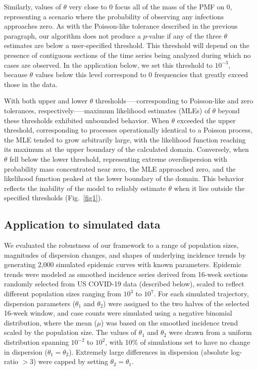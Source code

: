 \documentclass[11pt,letterpaper]{article}
\begin{document}
Similarly, values of $\theta$ very close to 0 focus all of the mass of the PMF on 0, representing a scenario where the probability of observing any infections approaches zero. As with the Poisson-like tolerance described in the previous paragraph, our algorithm does not produce a $p$-value if any of the three $\theta$ estimates are below a user-specified threshold. This threshold will depend on the presence of contiguous sections of the time series being analyzed during which no cases are observed. In the application below, we set this threshold to $10^{-3}$, because $\theta$ values below this level correspond to 0 frequencies that greatly exceed those in the data.

With both upper and lower $\theta$ thresholds--—corresponding to Poisson-like and zero tolerances, respectively—--maximum likelihood estimates (MLEs) of $\theta$ beyond these thresholds exhibited unbounded behavior. When $\theta$ exceeded the upper threshold, corresponding to processes operationally identical to a Poisson process, the MLE tended to grow arbitrarily large, with the likelihood function reaching its maximum at the upper boundary of the calculated domain. Conversely, when $\theta$ fell below the lower threshold, representing extreme overdispersion with probability mass concentrated near zero, the MLE approached zero, and the likelihood function peaked at the lower boundary of the domain. This behavior reflects the inability of the model to reliably estimate $\theta$ when it lies outside the specified thresholds (Fig.~\ref{fig1}).

\subsection*{Application to simulated data}
We evaluated the robustness of our framework to a range of population sizes, magnitudes of dispersion changes, and shapes of underlying incidence trends by generating 2,000 simulated epidemic curves with known parameters. 
Epidemic trends were modeled as smoothed incidence series derived from 16-week sections randomly selected from US COVID-19 data (described below), scaled to reflect different population sizes ranging from $10^3$ to $10^7$. 
For each simulated trajectory, dispersion parameters ($\theta_1$ and $\theta_2$) were assigned to the two halves of the selected 16-week window, and case counts were simulated using a negative binomial distribution, where the mean ($\mu$) was based on the smoothed incidence trend scaled by the population size. 
The values of $\theta_1$ and $\theta_2$ were drawn from a uniform distribution spanning $10^{-2}$ to $10^{2}$, with 10\% of simulations set to have no change in dispersion ($\theta_1 = \theta_2$). 
Extremely large differences in dispersion (absolute log-ratio $>3$) were capped by setting $\theta_2 = \theta_1$. 
\end{document}
